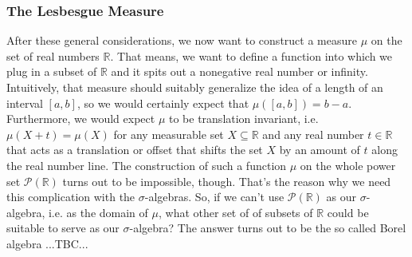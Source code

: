 \subsubsection{The Lesbesgue Measure}
After these general considerations, we now want to construct a measure $\mu$ on the set of real numbers $\mathbb{R}$. That means, we want to define a function into which we plug in a subset of $\mathbb{R}$ and it spits out a nonegative real number or infinity. Intuitively, that measure should suitably generalize the idea of a length of an interval $[a,b]$, so we would certainly expect that $\mu([a,b]) = b-a$. Furthermore, we would expect $\mu$ to be translation invariant, i.e. $\mu(X + t) = \mu(X)$ for any measurable set $X \subseteq \mathbb{R}$ and any real number $t \in \mathbb{R}$ that acts as a translation or offset that shifts the set $X$ by an amount of $t$ along the real number line. The construction of such a function $\mu$ on the whole power set $\mathcal{P}(\mathbb{R})$ turns out to be impossible, though. That's the reason why we need this complication with the $\sigma$-algebras. So, if we can't use $\mathcal{P}(\mathbb{R})$ as our $\sigma$-algebra, i.e. as the domain of $\mu$, what other set of of subsets of $\mathbb{R}$ could be suitable to serve as our $\sigma$-algebra? The answer turns out to be the so called Borel algebra ...TBC...













